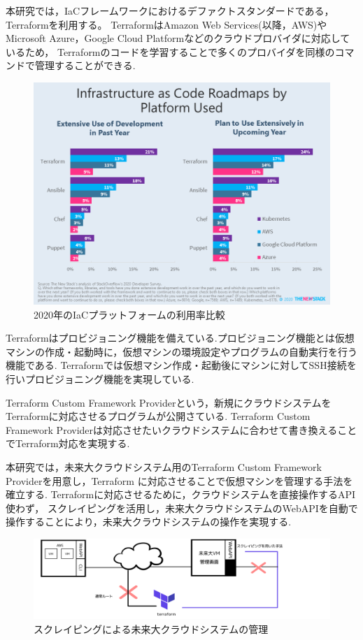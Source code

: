 \documentclass[11pt]{ujarticle}\sloppy
\begin{document}
本研究では，IaCフレームワークにおけるデファクトスタンダードである，Terraformを利用する。
TerraformはAmazon Web Services(以降，AWS)や
Microsoft Azure，Google Cloud Platformなどのクラウドプロバイダに対応しているため，
Terraformのコードを学習することで多くのプロバイダを同様のコマンドで管理することができる.


\begin{figure}[h]
	\includegraphics[width=1\linewidth]{./images/terraform.png}
	\caption{2020年のIaCプラットフォームの利用率比較\cite{THENEWSTACK}}
	\label{fig:terraform}
\end{figure}

Terraformはプロビジョニング機能を備えている.プロビジョニング機能とは仮想マシンの作成・起動時に，仮想マシンの環境設定やプログラムの自動実行を行う機能である.
Terraformでは仮想マシン作成・起動後にマシンに対してSSH接続を行いプロビジョニング機能を実現している.

Terraform Custom Framework Providerという，新規にクラウドシステムをTerraformに対応させるプログラムが公開さている.
Terraform Custom Framework Providerは対応させたいクラウドシステムに合わせて書き換えることでTerraform対応を実現する.


本研究では，未来大クラウドシステム用のTerraform Custom Framework Providerを用意し，Terraform に対応させることで仮想マシンを管理する手法を確立する.
Terraformに対応させるために，クラウドシステムを直接操作するAPI使わず，
スクレイピングを活用し，未来大クラウドシステムのWebAPIを自動で操作することにより，未来大クラウドシステムの操作を実現する.


\begin{figure}[h]
	\includegraphics[width=1\linewidth]{./images/scraping.png}
	\caption{スクレイピングによる未来大クラウドシステムの管理}
	\label{fig:scraping}
\end{figure}
\end{document}
